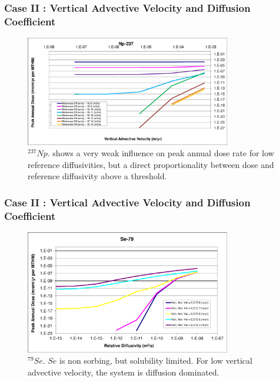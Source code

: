 \begin{frame}[c]
  \frametitle{Case II : Vertical Advective Velocity and Diffusion Coefficient}
\begin{figure}[ht!]
\centering
\includegraphics[width=0.8\textwidth]{AdvVelAndDiffCoeffEBSFail/Np-237-VAdvVel.eps}
\caption{$^{237}Np$.
shows a very weak influence on peak annual dose 
rate for low reference diffusivities, but a direct proportionality between 
dose and reference diffusivity above a threshold.}
\label{fig:VAdvVelNp237VAdvVel}
\end{figure}
\end{frame}

\begin{frame}[c]
  \frametitle{Case II : Vertical Advective Velocity and Diffusion Coefficient}
\begin{figure}[htp!]
\centering
\includegraphics[width=0.8\textwidth]{AdvVelAndDiffCoeffEBSFail/Se-79.eps}
\caption{$^{79}Se$.
$Se$ is non sorbing, but solubility limited.  
For low vertical advective velocity, 
the system is diffusion dominated.}
\label{fig:VAdvVelSe79}
\end{figure}
\end{frame}

